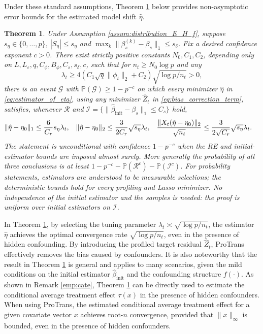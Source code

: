 \documentclass[12pt]{article}
\newtheorem{thm}{Theorem}
\begin{document}
Under these standard assumptions, Theorem \ref{thm:upper_bound_of_eta} below provides non-asymptotic error bounds for the estimated model shift $\hat{\eta}$.
\begin{thm}
\label{thm:upper_bound_of_eta}
Under Assumption \ref{assum:distribution_E_H_f}, suppose
$s_\eta\in\{0,\ldots,p\}$, $|S_\eta|\le s_\eta$ and $\max_k\|\beta_s^{(k)}-\beta_s\|_1\le s_\delta$.
Fix a desired confidence exponent $c>0$. There exist strictly positive
constants $N_0,C_1,C_2$, depending only on
$L,L_\varepsilon,q,C_\phi,B_\phi,C_s,s_\delta,c$, such that for
$n_t\ge N_0\log p$ and any
\[
 \lambda_t\ge4(C_1\sqrt q\|\phi_t\|_2+C_2)\sqrt{\log p/n_t}>0,
\]
there is an event $\mathcal G$ with $\mathbb P(\mathcal G)\ge1-p^{-c}$ on
which every minimizer $\hat\eta$ in \eqref{eq:estimator_of_eta}, using any
minimizer $\hat Z_t$ in \eqref{eq:bias_correction_term}, satisfies, whenever
$\mathcal R$ and $\mathcal I=\{\|\hat\beta_{\mathrm{init}}-\beta_s\|_1\le C_s\}$ hold,
\begin{align*}
 \|\hat\eta-\eta_0\|_1&\le {6\over C_r}s_\eta\lambda_t, &
 \|\hat\eta-\eta_0\|_2&\le {3\over2C_r}\sqrt{s_\eta}\lambda_t, &
 {\|X_t(\hat\eta-\eta_0)\|_2\over\sqrt{n_t}}
 &\le {3\over2\sqrt{C_r}}\sqrt{s_\eta}\lambda_t.
\end{align*}
The statement is unconditional with confidence $1-p^{-c}$ when the RE and
initial-estimator bounds are imposed almost surely. More generally the
probability of all three conclusions is at least
$1-p^{-c}-\mathbb P(\mathcal R^c)-\mathbb P(\mathcal I^c)$.
For probability statements, estimators are understood to be measurable
selections; the deterministic bounds hold for every profiling and Lasso
minimizer. No independence of the initial estimator and the samples is
needed: the proof is uniform over initial estimators on $\mathcal I$.
\end{thm}

In Theorem \ref{thm:upper_bound_of_eta}, by selecting the tuning parameter $\lambda_t\asymp \sqrt{\log p/n_t}$, the estimator $\hat{\eta}$ achieves the optimal convergence rate $\sqrt{\log p/n_t}$, even in the presence of hidden confounding. By introducing the profiled target residual $\hat{Z}_t$, ProTrans effectively removes the bias caused by confounders. It is also noteworthy that the result in Theorem \ref{thm:upper_bound_of_eta} is general and applies to many scenarios, given the mild conditions on the initial estimator $\hat{\beta}_{\text{init}}$ and the confounding structure $f(\cdot)$. %
As shown in Remark \ref{emp:cate}, Theorem \ref{thm:upper_bound_of_eta} can be directly used to estimate the conditional average treatment effect $\tau(x)$ in the presence of hidden confounders. When using ProTrans, the estimated conditional average treatment effect for a given covariate vector $x$ achieves root-$n$ convergence, provided that $\|x\|_{\infty}$ is bounded, even in the presence of hidden confounders.
\end{document}
